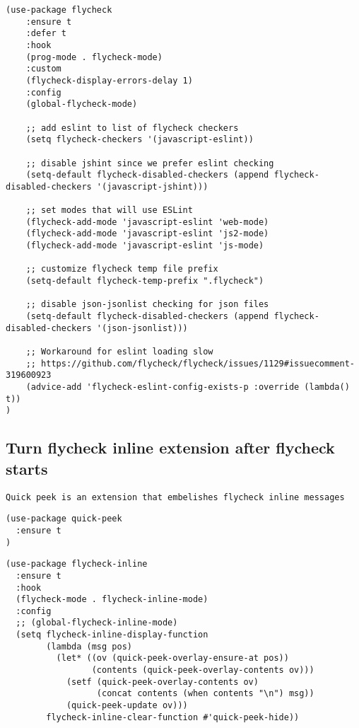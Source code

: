 \documentclass[11pt]{article}
\begin{document}
\begin{verbatim}
(use-package flycheck
    :ensure t
    :defer t
    :hook
    (prog-mode . flycheck-mode)
    :custom
    (flycheck-display-errors-delay 1)
    :config
    (global-flycheck-mode)

    ;; add eslint to list of flycheck checkers
    (setq flycheck-checkers '(javascript-eslint))

    ;; disable jshint since we prefer eslint checking
    (setq-default flycheck-disabled-checkers (append flycheck-disabled-checkers '(javascript-jshint)))

    ;; set modes that will use ESLint
    (flycheck-add-mode 'javascript-eslint 'web-mode)
    (flycheck-add-mode 'javascript-eslint 'js2-mode)
    (flycheck-add-mode 'javascript-eslint 'js-mode)

    ;; customize flycheck temp file prefix
    (setq-default flycheck-temp-prefix ".flycheck")

    ;; disable json-jsonlist checking for json files
    (setq-default flycheck-disabled-checkers (append flycheck-disabled-checkers '(json-jsonlist)))

    ;; Workaround for eslint loading slow
    ;; https://github.com/flycheck/flycheck/issues/1129#issuecomment-319600923
    (advice-add 'flycheck-eslint-config-exists-p :override (lambda() t))
)

\end{verbatim}


\subsection*{Turn flycheck inline extension after flycheck starts}
\label{sec:org2514a3e}

\begin{verbatim}
Quick peek is an extension that embelishes flycheck inline messages
\end{verbatim}


\begin{verbatim}
(use-package quick-peek
  :ensure t
)
\end{verbatim}

\begin{verbatim}
(use-package flycheck-inline
  :ensure t
  :hook
  (flycheck-mode . flycheck-inline-mode)
  :config
  ;; (global-flycheck-inline-mode)
  (setq flycheck-inline-display-function
        (lambda (msg pos)
          (let* ((ov (quick-peek-overlay-ensure-at pos))
                 (contents (quick-peek-overlay-contents ov)))
            (setf (quick-peek-overlay-contents ov)
                  (concat contents (when contents "\n") msg))
            (quick-peek-update ov)))
        flycheck-inline-clear-function #'quick-peek-hide))
\end{verbatim}
\end{document}
